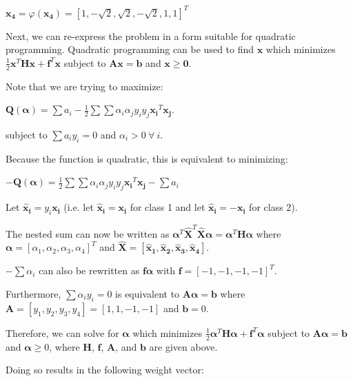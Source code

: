 \documentclass[fleqn]{article}
\begin{document}
\begin{enumerate}
	$\mathbf{x_4} = \varphi(\mathbf{x_4}) = [1,-\sqrt{2},\sqrt{2},-\sqrt{2},1,1]^T$
	
	Next, we can re-express the problem in a form suitable for quadratic programming. Quadratic programming can be used to find $\mathbf{x}$ which minimizes \newline $\frac{1}{2}\mathbf{x}^T\mathbf{H}\mathbf{x} + \mathbf{f}^T\mathbf{x}$ subject to $\mathbf{Ax} = \mathbf{b}$ and $\mathbf{x} \geq \mathbf{0}$.
	
	Note that we are trying to maximize:
	
	$\mathbf{Q(\boldsymbol{\alpha})} = \sum{a_i} - \frac{1}{2}\sum{\sum{\alpha_i\alpha_jy_iy_j\mathbf{x_i}^T\mathbf{x_j}}}$.
	
	subject to $\sum{a_iy_i} = 0$ and $\alpha_i > 0\ \forall\ i$.
	
	Because the function is quadratic, this is equivalent to minimizing:
	
	$-\mathbf{Q(\boldsymbol{\alpha})} = \frac{1}{2}\sum{\sum{\alpha_i\alpha_jy_iy_j\mathbf{x_i}^T\mathbf{x_j}}} - \sum{a_i}$
	
	Let $\mathbf{\hat{x}_i} = y_i\mathbf{x_i}$ (i.e. let $\mathbf{\hat{x}_i} = \mathbf{x_i}$ for class 1 and let $\mathbf{\hat{x}_i} = -\mathbf{x_i}$ for class 2).
	
	The nested sum can now be written as $\boldsymbol{\alpha}^T\mathbf{\hat{X}}^T\mathbf{\hat{X}}\boldsymbol{\alpha} = \boldsymbol{\alpha}^T\mathbf{H}\boldsymbol{\alpha}$ \newline where $\boldsymbol{\alpha} = [\alpha_1,\alpha_2,\alpha_3,\alpha_4]^T$ and $\mathbf{\hat{X}} = [\mathbf{\hat{x}_1},\mathbf{\hat{x}_2}, \mathbf{\hat{x}_3}, \mathbf{\hat{x}_4}]$.
	
	$-\sum{\alpha_i}$ can also be rewritten as $\mathbf{f}\boldsymbol{\alpha}$ with $\mathbf{f} = [-1,-1,-1,-1]^T$.
	  
	Furthermore, $\sum{\alpha_iy_i} = 0$ is equivalent to $\mathbf{A}\boldsymbol{\alpha} = \mathbf{b}$ where \newline $\mathbf{A} = [y_1,y_2,y_3,y_4] = [1,1,-1,-1]$ and $\mathbf{b} = 0$.
	
	Therefore, we can solve for $\boldsymbol{\alpha}$ which minimizes $\frac{1}{2}\boldsymbol{\alpha}^T\mathbf{H}\boldsymbol{\alpha} + \mathbf{f}^T\boldsymbol{\alpha}$ subject to $\mathbf{A}\boldsymbol{\alpha} = \mathbf{b}$ and $\boldsymbol{\alpha} \geq 0$, where $\mathbf{H}$, $\mathbf{f}$, $\mathbf{A}$, and $\mathbf{b}$ are given above.
	
	Doing so results in the following weight vector:
	

\end{enumerate}
\end{document}
